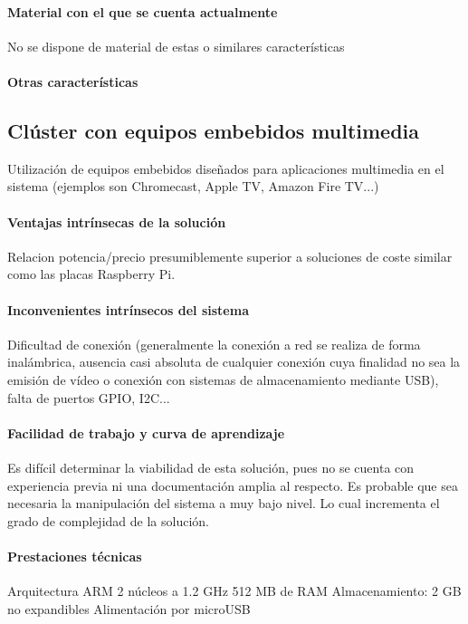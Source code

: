 \paragraph{Material con el que se cuenta actualmente}

No se dispone de material de estas o similares características

\paragraph{Otras características}

\subsection{Clúster con equipos embebidos multimedia }

Utilización de equipos embebidos diseñados para aplicaciones multimedia en el sistema (ejemplos son Chromecast, Apple TV, Amazon Fire TV...)

\paragraph{Ventajas intrínsecas de la solución}

Relacion potencia/precio presumiblemente superior a soluciones de coste similar como las placas Raspberry Pi.

\paragraph{Inconvenientes intrínsecos del sistema}

Dificultad de conexión (generalmente la conexión a red se realiza de forma inalámbrica, ausencia casi absoluta de cualquier conexión cuya finalidad no sea la emisión de vídeo o conexión con sistemas de almacenamiento mediante USB), falta de puertos GPIO, I2C...

\paragraph{Facilidad de trabajo y curva de aprendizaje}
Es difícil determinar la viabilidad de esta solución, pues no se cuenta con experiencia previa ni una documentación amplia al respecto.
Es probable que sea necesaria la manipulación del sistema a muy bajo nivel. Lo cual incrementa el grado de complejidad de la solución.

\paragraph{Prestaciones técnicas}
Arquitectura ARM
2 núcleos a 1.2 GHz
512 MB de RAM
Almacenamiento: 2 GB no expandibles
Alimentación por microUSB

